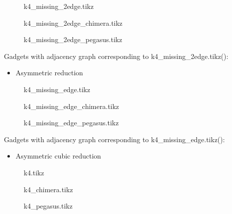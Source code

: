\documentclass{article}
\begin{document}
\begin{figure}

\caption{k4\_missing\_2edge.tikz}
\end{figure}

\begin{figure}

\caption{k4\_missing\_2edge\_chimera.tikz}
\end{figure}

\begin{figure}

\caption{k4\_missing\_2edge\_pegasus.tikz}
\end{figure}

Gadgets with adjacency graph corresponding to k4\_missing\_2edge.tikz(\scalebox{.25}{}):

\begin{itemize}
\item Asymmetric reduction
\end{itemize}

\begin{figure}

\caption{k4\_missing\_edge.tikz}
\end{figure}

\begin{figure}

\caption{k4\_missing\_edge\_chimera.tikz}
\end{figure}

\begin{figure}

\caption{k4\_missing\_edge\_pegasus.tikz}
\end{figure}

Gadgets with adjacency graph corresponding to k4\_missing\_edge.tikz(\scalebox{.25}{}):

\begin{itemize}
\item Asymmetric cubic reduction
\end{itemize}

\begin{figure}

\caption{k4.tikz}
\end{figure}

\begin{figure}

\caption{k4\_chimera.tikz}
\end{figure}

\begin{figure}

\caption{k4\_pegasus.tikz}
\end{figure}
\end{document}

